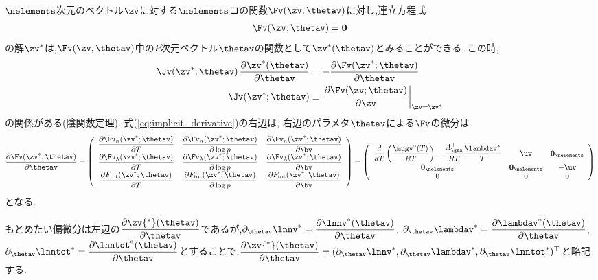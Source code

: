 $\nelements$次元のベクトル$\zv$に対する$\nelements$コの関数$\Fv(\zv; \thetav)$に対し,連立方程式
\begin{align}
    \Fv(\zv; \thetav) = \boldsymbol{0}
\end{align}
の解$\zv^\ast$は,$\Fv(\zv, \thetav)$中の$P$次元ベクトル$\thetav$の関数として$\zv^\ast(\thetav)$とみることができる. この時,
\begin{align}
\label{eq:implicit_derivative}
    \Jv(\zv^\ast; \thetav) \, \frac{\partial \zv^\ast(\thetav)}{\partial \thetav} &= - \frac{\partial \Fv(\zv^\ast; \thetav)}{\partial \thetav} \\ 
    \Jv(\zv^\ast; \thetav) &\equiv \left. \frac{\partial \Fv(\zv; \thetav)}{\partial \zv} \right|_{\zv=\zv^\ast}
\end{align}
の関係がある(陰関数定理). 式(\ref{eq:implicit_derivative})の右辺は,
右辺のパラメタ$\thetav$による$\Fv$の微分は
\begin{align}
\label{eq:fdpar}
\dfrac{\partial \Fv (\zv^\ast; \thetav)}{\partial \thetav}
=
\left(
\begin{array}{ccc}
\dfrac{\partial \Fv_n(\zv^\ast; \thetav)}{\partial T} & \dfrac{\partial \Fv_n(\zv^\ast; \thetav)}{\partial \log{p}} & \dfrac{\partial \Fv_n(\zv^\ast; \thetav)}{\partial \bv} \\
\dfrac{\partial \Fv_\lambda(\zv^\ast; \thetav)}{\partial T} & \dfrac{\partial \Fv_\lambda(\zv^\ast; \thetav)}{\partial \log{p}} & \dfrac{\partial \Fv_\lambda(\zv^\ast; \thetav)}{\partial \bv} \\
\dfrac{\partial F_\mathrm{tot}(\zv^\ast; \thetav)}{\partial T} & \dfrac{\partial F_\mathrm{tot}(\zv^\ast; \thetav)}{\partial \log{p}} & \dfrac{\partial F_\mathrm{tot}(\zv^\ast; \thetav)}{\partial \bv} \\
\end{array}
\right)
=
\left(
\begin{array}{ccc}
\dfrac{d}{d T} \left( \dfrac{\mugv^\circ (T)}{R T} \right) - \dfrac{A_\gas^\top }{R T} \dfrac{\lambdav^\ast}{T} & \uv & \boldsymbol{0}_\nelements\\
\boldsymbol{0}_\nelements & \boldsymbol{0}_\nelements & - \uv\\
0 & 0 & 0 \\
\end{array}
\right)
\end{align}
となる. 


もとめたい偏微分は左辺の$\dfrac{\partial \zv{^\ast} (\thetav)}{\partial \thetav}$であるが,$\partial_{\thetav} \lnnv^\ast = \dfrac{\partial \lnnv^\ast(\thetav)}{\partial \thetav}$, $\partial_{\thetav} \lambdav^\ast = \dfrac{\partial \lambdav^\ast(\thetav)}{\partial \thetav}$, $\partial_{\thetav} \lnntot^\ast = \dfrac{\partial \lnntot^\ast(\thetav)}{\partial \thetav}$とすることで,$\dfrac{\partial \zv{^\ast} (\thetav)}{\partial \thetav} = (\partial_{\thetav} \lnnv^\ast, \partial_{\thetav} \lambdav^\ast,\partial_{\thetav} \lnntot^\ast )^\top$と略記する. 

